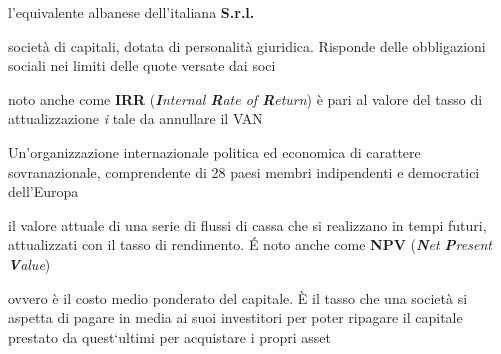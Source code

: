 \begin{acronym}
\begin{multicols}{2}
		   {\newline \small l'equivalente albanese dell'italiana \textbf{\ac{S.r.l.}}\par}

		   {\newline \small società di capitali, dotata di personalità giuridica. Risponde delle obbligazioni sociali nei limiti delle quote versate dai soci\par}

		   {\newline \small noto anche come \textbf{IRR} (\textit{\textbf{I}nternal \textbf{R}ate of \textbf{R}eturn}) è pari al valore del tasso di attualizzazione \textit{i} tale da annullare il \ac{VAN} \par}		   

		   {\newline \small Un'organizzazione internazionale politica ed economica di carattere sovranazionale, comprendente di 28 paesi membri indipendenti e democratici dell'Europa\cite{paesiUE} \par}
		   
		   {\newline \small il valore attuale di una serie di flussi di cassa che si realizzano in tempi futuri, attualizzati con il tasso di rendimento. \'E noto anche come \textbf{NPV} (\textit{\textbf{N}et \textbf{P}resent \textbf{V}alue}) \par}		   

		   {\newline \small ovvero è il costo medio ponderato del capitale. \`E il tasso che una società si aspetta di pagare in media ai suoi investitori per poter ripagare il capitale prestato da quest`ultimi per acquistare i propri asset \par}		
		   
\end{multicols}
\end{acronym}